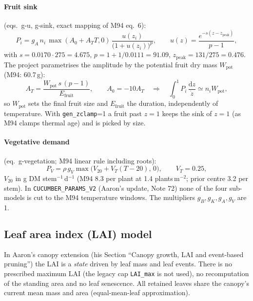 \documentclass[11pt,a4paper]{article}
\begin{document}
\paragraph{Fruit sink} (eqs.~g-u, g-sink, exact mapping of M94 eq.~6):
\begin{equation}\label{eq:a-sink}
P_i=g_A\,n_i\,\max(A_0+A_TT,0)\,\frac{u(z_i)}{\bigl(1+u(z_i)\bigr)^{p}},\qquad
u(z)=\frac{e^{-s(z-z_{\text{peak}})}}{p-1},
\end{equation}
with $s=0.0170\cdot275=4.675$, $p=1+1/0.0111=91.09$, $z_{\text{peak}}=131/275=0.476$. The project parametrises
the amplitude by the potential fruit dry mass $W_{\text{pot}}$ (M94: 60.7\,g):
\begin{equation}
A_T=\frac{W_{\text{pot}}\,s\,(p-1)}{E_{\text{fruit}}},\qquad A_0=-10A_T
\quad\Rightarrow\quad \int_0^1 P_i\,\frac{\mathrm{d}z}{\dot z}\simeq n_iW_{\text{pot}},
\end{equation}
so $W_{\text{pot}}$ sets the final fruit size and $E_{\text{fruit}}$ the duration, independently of temperature.
With \texttt{gen\_zclamp}=1 a fruit past $z=1$ keeps the sink of $z=1$ (as M94 clamps thermal age) and is
picked by size.

\paragraph{Vegetative demand} (eq.~g-vegetation; M94 linear rule including roots):
\begin{equation}
P_V=\rho\,g_V\max\bigl(V_{20}+V_T(T-20),\,0\bigr),\qquad V_T=0.25,
\end{equation}
$V_{20}$ in g DM stem$^{-1}$\,d$^{-1}$ (M94 8.3 per plant at 1.4 plants\,m$^{-2}$; prior centre 3.2 per stem).
In \texttt{CUCUMBER\_PARAMS\_V2} (Aaron's update, Note 72) none of the four sub-models is cut to the M94
temperature windows. The multipliers $g_B,g_K,g_A,g_V$ are 1.

\subsection{Leaf area index (LAI) model}\label{sec:lai}
In Aaron's canopy extension (his Section ``Canopy growth, LAI and event-based pruning'') the LAI is a
\emph{state} driven by leaf mass and leaf events. There is no prescribed maximum LAI (the legacy cap
\texttt{LAI\_max} is not used), no recomputation of the standing area and no leaf senescence. All
retained leaves share the canopy's current mean mass and area (equal-mean-leaf approximation).
\end{document}
